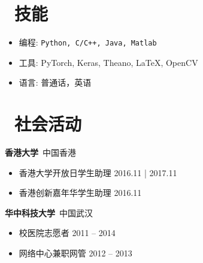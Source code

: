 \documentclass{resume}
\begin{document}
\section{\faCogs\ 技能}
\begin{itemize}[parsep=0.5ex]
  \item 编程: \texttt{Python, C/C++, Java, Matlab}
  \item 工具: PyTorch, Keras, Theano, LaTeX, OpenCV
  \item 语言: 普通话，英语
\end{itemize}

\section{\faInfo\ 社会活动}
\textbf{香港大学}~中国香港
\begin{itemize}
  \item 香港大学开放日学生助理 \hfill 2016.11 | 2017.11
  \item 香港创新嘉年华学生助理 \hfill 2016.11
\end{itemize}

\vspace*{.1in}
\textbf{华中科技大学}~中国武汉
\begin{itemize}
  \item 校医院志愿者 \hfill 2011 -- 2014
  \item 网络中心兼职网管 \hfill 2012 -- 2013
\end{itemize}
\end{document}
